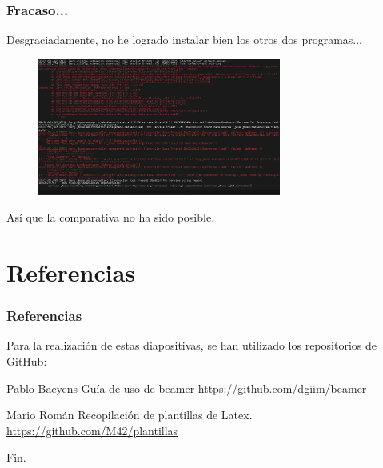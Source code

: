 \documentclass[12pt, aspectratio=169]{beamer} %
\begin{document}
	\begin{frame}
		\frametitle{Fracaso...}
		
		Desgraciadamente, no he logrado instalar bien los otros dos programas...
		
		\pause
		
		\begin{figure}
			\includegraphics[width=8cm]{Fail_WF.png}
		\end{figure}
		
		\pause
		
		Así que la comparativa no ha sido posible.
		
	\end{frame}


\section{Referencias}
	\begin{frame}
		\frametitle{Referencias}
		
		Para la realización de estas diapositivas, se han utilizado los repositorios de GitHub:
		
		\footnotesize{
		  \begin{thebibliography}{7} %
		     Pablo Baeyens
		      \newblock Guía de uso de beamer
		      \newblock \url{https://github.com/dgiim/beamer}
		      
		     Mario Román
		      \newblock Recopilación de plantillas de Latex.
		      \newblock \url{https://github.com/M42/plantillas}
		  \end{thebibliography}
		}
	\end{frame}


\begin{frame}
\Huge{\centerline{Fin.}}
\end{frame}

\end{document}
